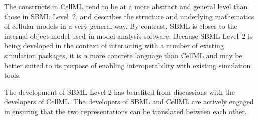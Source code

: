 \documentclass[10pt,twocolumntoc]{cekarticle}
\begin{document}
The constructs in CellML tend to be at a more abstract and general level
than those in SBML Level~2, and describes the structure and underlying
mathematics of cellular models in a very general way.  By contrast, SBML is
closer to the internal object model used in model analysis software.
Because SBML Level~2 is being developed in the context of interacting with
a number of existing simulation packages, it is a more concrete language
than CellML and may be better suited to its purpose of enabling
interoperability with existing simulation tools.

The development of SBML Level 2 has benefited from discussions with the
developers of CellML.  The developers of SBML and CellML are actively
engaged in ensuring that the two representations can be translated between
each other.






\end{document}
